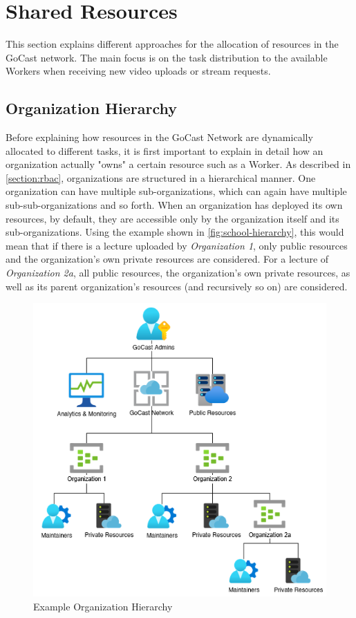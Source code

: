 \section{Shared Resources}\label{section:shared-resources}

This section explains different approaches for the allocation of resources in the GoCast network. The main focus is on the task distribution to the available Workers when receiving new video uploads or stream requests.

\subsection{Organization Hierarchy}
Before explaining how resources in the GoCast Network are dynamically allocated to different tasks, it is first important to explain in detail how an organization actually "owns" a certain resource such as a Worker. As described in \autoref{section:rbac}, organizations are structured in a hierarchical manner. One organization can have multiple sub-organizations, which can again have multiple sub-sub-organizations and so forth. When an organization has deployed its own resources, by default, they are accessible only by the organization itself and its sub-organizations. Using the example shown in \autoref{fig:school-hierarchy}, this would mean that if there is a lecture uploaded by \textit{Organization 1}, only public resources and the organization's own private resources are considered. For a lecture of \textit{Organization 2a}, all public resources, the organization's own private resources, as well as its parent organization's resources (and recursively so on) are considered. 

\begin{figure}[htpb]
    \centering
    \includegraphics[width=350pt]{images/OrganizationHierarchy.png}
    \caption[Example Organization Hierarchy]{Example Organization Hierarchy}\label{fig:school-hierarchy}
\end{figure}

